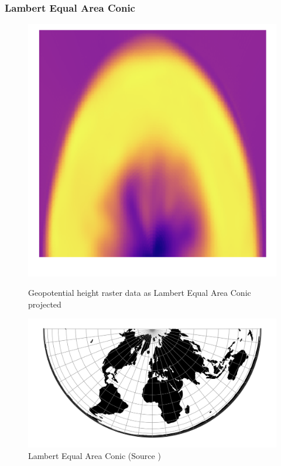 \subsubsection*{Lambert Equal Area Conic}
\begin{figure}[h]
    \centering
    \begin{minipage}{0.30\textwidth}
        \centering
        \includegraphics[width=0.9\linewidth]{figures/chapter-8/geopoth_leac.png}
        \caption{ Geopotential height raster data as Lambert Equal Area Conic projected}
        \label{fig:leac_geopoth_raster}
    \end{minipage}\hfill
    \begin{minipage}{0.30\textwidth}
        \centering
        \includegraphics[width=0.9\linewidth]{figures/chapter-8/leac.png}
        \caption{Lambert Equal Area Conic (Source \cite{PROJ_SITE})}

\end{minipage}
\end{figure}
